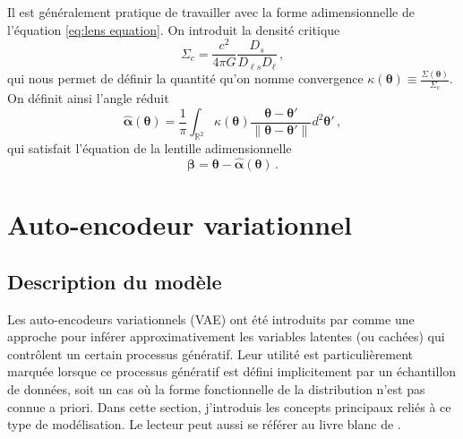 Il est généralement pratique de travailler avec la forme adimensionnelle de l'équation \eqref{eq:lens equation}. 
On introduit la densité critique 
\begin{equation}\label{eq:densite critique}
        \Sigma_c = \frac{c^2}{4 \pi G}\frac{D_{s}}{D_{\ell s} D_\ell}\, ,
\end{equation} 
qui nous permet de définir la quantité qu'on nomme convergence $\displaystyle \kappa(\boldsymbol{ \theta} ) \equiv \frac{\Sigma(\boldsymbol{ \theta})}{\Sigma_c}$. 
On définit ainsi l'angle réduit 
\begin{equation}\label{eq:alpha adim}
        \hat{\boldsymbol{ \alpha}} (\boldsymbol{ \theta}) = \frac{1}{\pi}\int_{\mathbb{R}^{2}} \kappa(\boldsymbol{ \theta} )
        \frac{\boldsymbol{ \theta} - \boldsymbol{ \theta}'  }{\lVert \boldsymbol{ \theta} - \boldsymbol{ \theta}' \rVert  } d^{2}\boldsymbol{ \theta}'\, ,
\end{equation} 
qui satisfait l'équation de la lentille adimensionnelle 
\begin{equation}\label{eq:lens equation adim}
        \boldsymbol{ \beta} = \boldsymbol{ \theta} - \hat{\boldsymbol{ \alpha}}(\boldsymbol{ \theta})\, . 
\end{equation}


\section{Auto-encodeur variationnel}\label{sec:vae}
 
\subsection{Description du modèle}

Les auto-encodeurs variationnels (VAE) ont été introduits par \citet{Kingma2013} comme une approche 
pour inférer approximativement les variables latentes (ou cachées) qui contrôlent un certain processus génératif. 
Leur utilité est particulièrement marquée lorsque ce processus génératif est défini implicitement par un échantillon de données, 
soit un cas où la forme fonctionnelle de la distribution n'est pas connue a priori.
Dans cette section, j'introduis 
les concepts principaux reliés à ce type de modélisation. 
Le lecteur peut aussi se référer au livre blanc de \citet{Kingma2019}.

